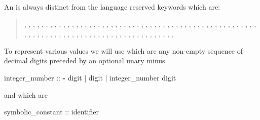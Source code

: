 %
An  is always distinct from the \nusmv language
reserved keywords which are: \label{list of reserved keywords}\\
\begin{quote}
%
, , ,
, 
, , , ,
, ,
, , , ,
, ,
, , ,
,
, , ,
, , , ,
, , , ,
, , ,
, , , ,
, , 
,
, , , ,
, , , , ,
, ,
,
, , , ,
, , , , ,
, , , , ,
, , , ,
, , , ,
, , , ,
, , , ,
, , , ,
, , 
\end{quote}

To represent various values we will use 
which are any non-empty sequence of decimal digits preceded by an
optional unary minus

\begin{Grammar}
integer_number ::
        \textbf{-} digit
      | digit
      | integer_number digit                        
\end{Grammar}

\noindent and  which are 

\begin{Grammar}
  symbolic_constant :: identifier
\end{Grammar}

